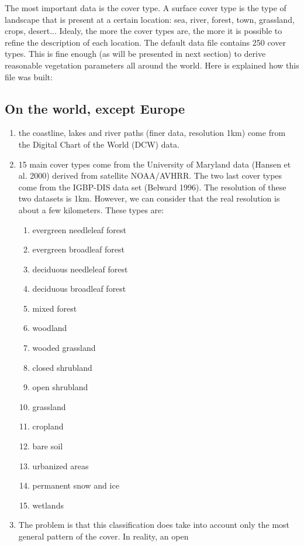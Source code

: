 The most important data is the cover type. A surface cover type is the
type of landscape that is present at a certain location:
sea, river, forest, town, grassland, crops, desert...
Idealy, the more the cover types are, the more it is possible to refine
the description of each location. The default data file contains 250
cover types.
This is fine enough (as will be presented in next section) to derive
reasonable vegetation parameters all around the world. Here is explained
how this file was built:

\subsection{On the world, except Europe}

\begin{enumerate}
\item the coastline, lakes and river paths
(finer data, resolution 1km) come from the Digital Chart of the World
(DCW) data.
\item 15 main cover types come from the University of Maryland data
(Hansen et al. 2000) derived from satellite NOAA/AVHRR.
The two last cover types come from the IGBP-DIS data set (Belward 1996).
The resolution of these two datasets is 1km. However, we can consider
that the real resolution is about a few kilometers.
These types are:
\begin{enumerate}
\item evergreen needleleaf forest
\item evergreen broadleaf forest
\item deciduous needleleaf forest
\item deciduous broadleaf forest
\item mixed forest
\item woodland
\item wooded grassland
\item closed shrubland
\item open shrubland
\item grassland
\item cropland
\item bare soil
\item urbanized areas
\item permanent snow and ice
\item wetlands
\end{enumerate}
\item The problem is that this classification does take into account
only the most general pattern of the cover. In reality, an open

\end{enumerate}
